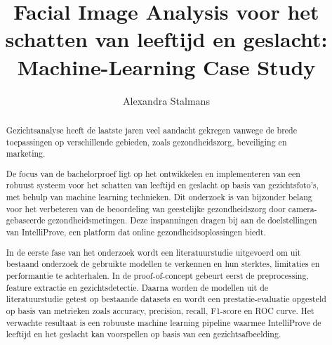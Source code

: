 \documentclass{hogent-article}
\title{Facial Image Analysis voor het schatten van leeftijd en geslacht: Machine-Learning Case Study}
\author{Alexandra Stalmans}
\begin{document}
\begin{abstract}
Gezichtsanalyse heeft de laatste jaren veel aandacht gekregen vanwege de brede toepassingen op verschillende gebieden, zoals gezondheidszorg, beveiliging en marketing.

De focus van de bachelorproef ligt op het ontwikkelen en implementeren van een robuust systeem voor het schatten van leeftijd en geslacht op basis van gezichtsfoto's, met behulp van machine learning technieken. Dit onderzoek is van bijzonder belang voor het verbeteren van de beoordeling van geestelijke gezondheidszorg door camera-gebaseerde gezondheidsmetingen. Deze inspanningen dragen bij aan de doelstellingen van IntelliProve, een platform dat online gezondheidsoplossingen biedt.

In de eerste fase van het onderzoek wordt een literatuurstudie uitgevoerd om uit bestaand onderzoek de gebruikte modellen te verkennen en hun sterktes, limitaties en performantie te achterhalen. In de proof-of-concept gebeurt eerst de preprocessing, feature extractie en gezichtsdetectie. Daarna worden de modellen uit de literatuurstudie getest op bestaande datasets en wordt een prestatie-evaluatie opgesteld op basis van metrieken zoals accuracy, precision, recall, F1-score en ROC curve. Het verwachte resultaat is een robuuste machine learning pipeline waarmee IntelliProve de leeftijd en het geslacht kan voorspellen op basis van een gezichtsafbeelding.
\end{abstract}

\tableofcontents


\printbibliography[heading=bibintoc]
\end{document}
